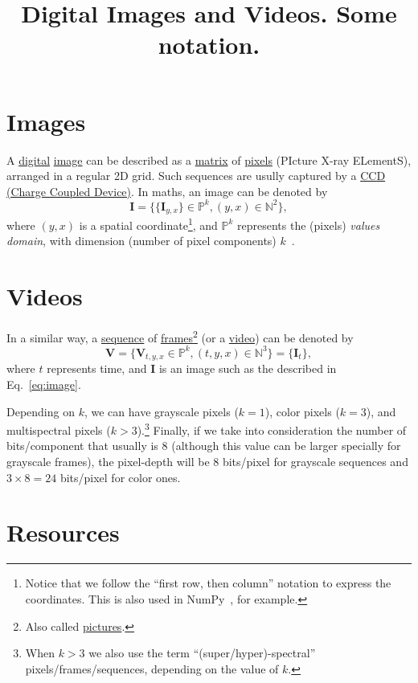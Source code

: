 
\title{Digital Images and Videos. Some notation.}

\maketitle

\tableofcontents

\section{Images}
A \href{https://en.wikipedia.org/wiki/Digital_data}{digital}
\href{https://en.wikipedia.org/wiki/Digital_image}{image} can be
described as a
\href{https://en.wikipedia.org/wiki/Matrix_(mathematics)}{matrix} of
\href{https://en.wikipedia.org/wiki/Pixel}{pixels} (PIcture X-ray
ELementS), arranged in a regular 2D grid. Such sequences are usully
captured by a
\href{https://en.wikipedia.org/wiki/Charge-coupled_device}{CCD (Charge
  Coupled Device)}. In maths, an image can be denoted by
\begin{equation}
  {\mathbf I} = \{\{{\mathbf I}_{y,x}\}\in\mathbb{P}^{k}, (y,x)\in\mathbb{N}^2\},
  \label{eq:image}
\end{equation}
where $(y,x)$ is a spatial coordinate\footnote{Notice that we follow
the ``first row, then column'' notation to express the
coordinates. This is also used in NumPy~\cite{harris2020array}, for
example.}, and $\mathbb{P}^{k}$ represents the (pixels) \emph{values
domain}, with dimension (number of pixel components)
$k$~\cite{burger2016digital}.

\section{Videos}
In a similar way, a
\href{https://en.wikipedia.org/wiki/Sequence}{sequence} of
\href{https://en.wikipedia.org/wiki/Film_frame}{frames}\footnote{Also called \href{https://en.wikipedia.org/wiki/Group_of_pictures}{pictures}.} (or a
\href{https://en.wikipedia.org/wiki/Video}{video}) can be denoted by
\begin{equation}
  {\mathbf V} = \{{\mathbf V}_{t,y,x}\in\mathbb{P}^{k}, (t,y,x)\in\mathbb{N}^3\} = \{{\mathbf I}_t\},
  \label{eq:video}
\end{equation}
where $t$ represents time, and ${\mathbf I}$ is an image such
as the described in Eq.~\eqref{eq:image}.

Depending on $k$, we can have grayscale pixels ($k=1$), color pixels
($k=3$), and multispectral pixels ($k>3$).\footnote{When $k>3$ we also
use the term ``(super/hyper)-spectral'' pixels/frames/sequences, depending
on the value of $k$.} Finally, if we take into consideration the
number of bits/component that usually is $8$ (although this value can be larger
specially for grayscale frames), the pixel-depth will be $8$
bits/pixel for grayscale sequences and $3\times 8=24$ bits/pixel for
color ones.

\section{Resources}

\renewcommand{\addcontentsline}[3]{}%

